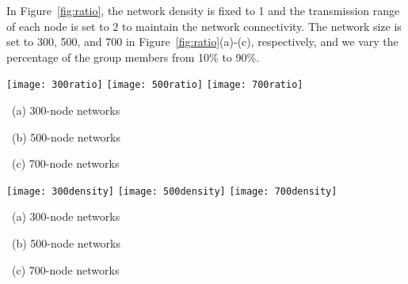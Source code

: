 \documentclass[10pt, conference, compsocconf]{IEEEtran}
\begin{document}
  In Figure~\ref{fig:ratio}, the network density is fixed to 1 and the transmission range of each node is set to 2 to maintain the network connectivity. The network size is set to 300, 500, and 700 in Figure~\ref{fig:ratio}(a)-(c), respectively, and we vary the percentage of the group members from 10\% to 90\%.
\begin{figure*}[t]
      \begin{center}
        \texttt{[image: 300ratio]}
	    \texttt{[image: 500ratio]}
        \texttt{[image: 700ratio]}
        \parbox{.325\textwidth}{\center\scriptsize~(a) 300-node networks}
        \parbox{.325\textwidth}{\center\scriptsize~(b) 500-node networks}
        \parbox{.325\textwidth}{\center\scriptsize~(c) 700-node networks}
        \caption{Comparing different algorithms for building multicast trees with the network density fixed to be 2.}
        \label{fig:ratio}
      \end{center}
      \vspace{-.9ex}
    \end{figure*}
    \begin{figure*}[t]
      \begin{center}
        \texttt{[image: 300density]}
	    \texttt{[image: 500density]}
        \texttt{[image: 700density]}
        \parbox{.325\textwidth}{\center\scriptsize~(a) 300-node networks}
        \parbox{.325\textwidth}{\center\scriptsize~(b) 500-node networks}
        \parbox{.325\textwidth}{\center\scriptsize~(c) 700-node networks}
        \caption{Comparing different algorithms for building multicast trees with the percentage of group members fixed to be 60\%.}
        \label{fig:density}
      \end{center}
      \vspace{-.9ex}
    \end{figure*}
\end{document}
